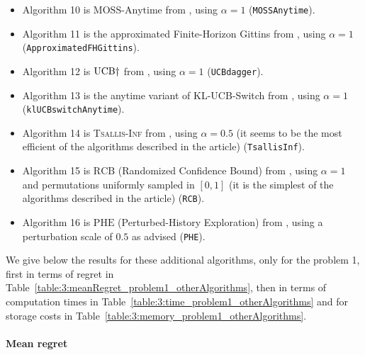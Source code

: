 \begin{itemize}
    \item Algorithm 10 is
    $\mathrm{MOSS}$-$\mathrm{Anytime}$ from \cite{Degenne16}, using $\alpha=1$ (\texttt{MOSSAnytime}).

    \item Algorithm 11 is
    the approximated Finite-Horizon Gittins from \cite{Lattimore16a}, using $\alpha=1$ (\texttt{ApproximatedFHGittins}).

    \item Algorithm 12 is
    $\mathrm{UCB}\dagger$ from \cite{Lattimore2018refining}, using $\alpha=1$ (\texttt{UCBdagger}).

    \item Algorithm 13 is
    the anytime variant of KL-UCB-Switch from \cite{GarivierHadiji2018}, using $\alpha=1$ (\texttt{klUCBswitchAnytime}).

    \item Algorithm 14 is
    \textsc{Tsallis-Inf} from \cite{Zimmert2018}, using $\alpha=0.5$ (it seems to be the most efficient of the algorithms described in the article) (\texttt{TsallisInf}).

    \item Algorithm 15 is
    $\mathrm{RCB}$ (Randomized Confidence Bound) from \cite{KimTewari2019}, using $\alpha=1$ and permutations uniformly sampled in $[0,1]$ (it is the simplest of the algorithms described in the article) (\texttt{RCB}).

    \item Algorithm 16 is
    $\mathrm{PHE}$ (Perturbed-History Exploration) from \cite{KvetonSzepesvari2019}, using a perturbation scale of $0.5$ as advised (\texttt{PHE}).

\end{itemize}

We give below the results for these additional algorithms, only for the problem 1,
first in terms of regret in Table~\ref{table:3:meanRegret_problem1_otherAlgorithms},
then in terms of computation times in Table~\ref{table:3:time_problem1_otherAlgorithms}
and for storage costs in Table~\ref{table:3:memory_problem1_otherAlgorithms}.



\paragraph{Mean regret}

